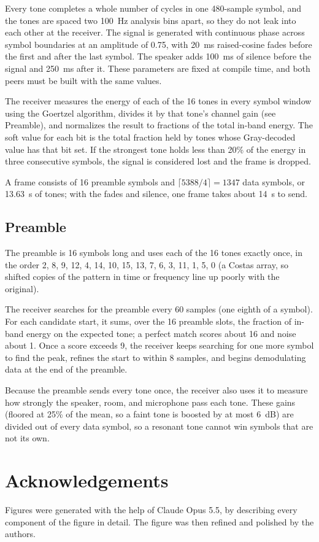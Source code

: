 \documentclass{article}
\begin{document}
Every tone completes a whole number of cycles in one 480-sample symbol, and the tones are spaced two 100~Hz analysis bins apart, so they do not leak into each other at the receiver. The signal is generated with continuous phase across symbol boundaries at an amplitude of 0.75, with 20~ms raised-cosine fades before the first and after the last symbol. The speaker adds 100~ms of silence before the signal and 250~ms after it. These parameters are fixed at compile time, and both peers must be built with the same values.

The receiver measures the energy of each of the 16 tones in every symbol window using the Goertzel algorithm, divides it by that tone's channel gain (see Preamble), and normalizes the result to fractions of the total in-band energy. The soft value for each bit is the total fraction held by tones whose Gray-decoded value has that bit set. If the strongest tone holds less than 20\% of the energy in three consecutive symbols, the signal is considered lost and the frame is dropped.

A frame consists of 16 preamble symbols and $\lceil 5388 / 4 \rceil = 1347$ data symbols, or 13.63~s of tones; with the fades and silence, one frame takes about 14~s to send.

\subsection{Preamble}
The preamble is 16 symbols long and uses each of the 16 tones exactly once, in the order 2, 8, 9, 12, 4, 14, 10, 15, 13, 7, 6, 3, 11, 1, 5, 0 (a Costas array, so shifted copies of the pattern in time or frequency line up poorly with the original).

The receiver searches for the preamble every 60 samples (one eighth of a symbol). For each candidate start, it sums, over the 16 preamble slots, the fraction of in-band energy on the expected tone; a perfect match scores about 16 and noise about 1. Once a score exceeds 9, the receiver keeps searching for one more symbol to find the peak, refines the start to within 8 samples, and begins demodulating data at the end of the preamble.

Because the preamble sends every tone once, the receiver also uses it to measure how strongly the speaker, room, and microphone pass each tone. These gains (floored at 25\% of the mean, so a faint tone is boosted by at most 6~dB) are divided out of every data symbol, so a resonant tone cannot win symbols that are not its own.

\section{Acknowledgements}
Figures were generated with the help of Claude Opus 5.5, by describing every component of the figure in detail. The figure was then refined and polished by the authors.
\end{document}
